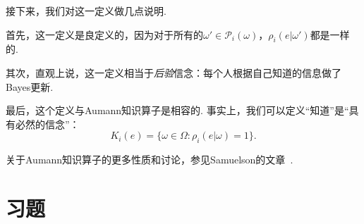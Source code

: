 接下来，我们对这一定义做几点说明. 

首先，这一定义是良定义的，因为对于所有的$\omega'\in\mathcal P_i(\omega)$，$\rho_i(e|\omega')$都是一样的.

其次，直观上说，这一定义相当于\textit{后验}信念：每个人根据自己知道的信息做了Bayes更新.

最后，这个定义与Aumann知识算子是相容的. 事实上，我们可以定义“知道”是“具有必然的信念”：
\[K_i(e)=\{\omega\in\Omega:\rho_i(e|\omega) = 1\}.\]

\begin{remark}
    关于Aumann知识算子的更多性质和讨论，参见Samuelson的文章~\cite{samuelsonModelingKnowledgeEconomic2004}. 
\end{remark}

\section{习题}

